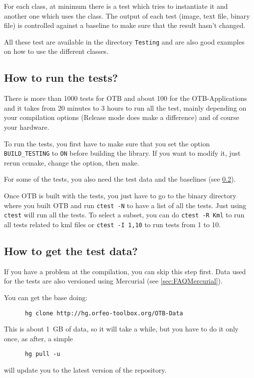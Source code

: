 For each class, at minimum there is a test which tries to instantiate it and another one which uses the class. The output of each test (image, text file, binary file) is controlled against a baseline to make sure that the result hasn't changed.

All these test are available in the directory \texttt{Testing} and are also good examples on how to use the different classes.

\subsection{How to run the tests?}

There is more than 1000 tests for OTB and about 100 for the OTB-Applications and it takes from 20 minutes to 3 hours to run all the test, mainly depending on your compilation options (Release mode does make a difference) and of course your hardware.

To run the tests, you first have to make sure that you set the option \texttt{BUILD\_TESTING} to \texttt{ON} before building the library. If you want to modify it, just rerun ccmake, change the option, then make.

For some of the tests, you also need the test data and the baselines (see \ref{sec:FAQTestData}).

Once OTB is built with the tests, you just have to go to the binary directory where you built OTB and run \texttt{ctest -N} to have a list of all the tests. Just using \texttt{ctest} will run all the tests. To select a subset, you can do \texttt{ctest -R Kml} to run all tests related to kml files or \texttt{ctest -I 1,10} to run tests from 1 to 10.

\subsection{How to get the test data?}\label{sec:FAQTestData}

If you have a problem at the compilation, you can skip this step first.
Data used for the tests are also versioned using Mercurial (see \ref{sec:FAQMercurial}).

You can get the base doing:
\begin{verbatim}
      hg clone http://hg.orfeo-toolbox.org/OTB-Data
\end{verbatim}

This is about 1~GB of data, so it will take a while, but you have to do it only once, as after, a simple
\begin{verbatim}
      hg pull -u
\end{verbatim}
will update you to the latest version of the repository.

